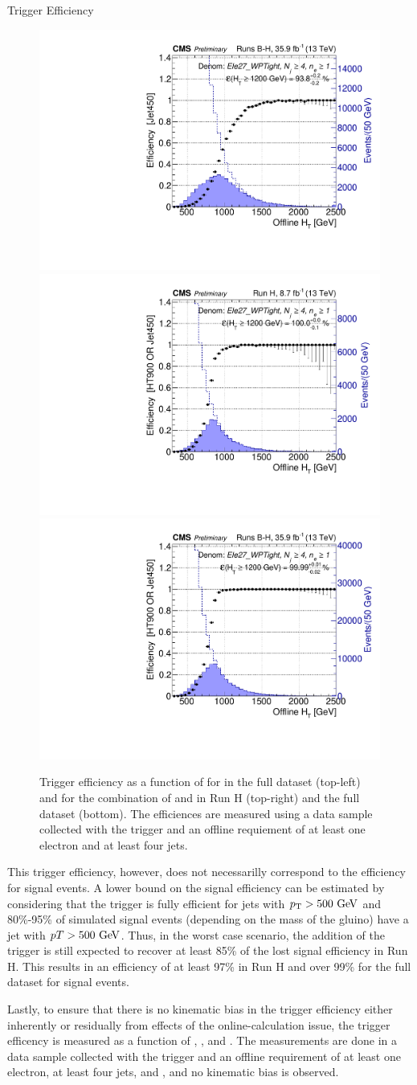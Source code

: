 \begin{section}{Trigger Efficiency}
\begin{figure}[tbp!]
\centering
\includegraphics[angle=0,width=0.45\columnwidth]{fig/trig_jet_runsbh.pdf}
\includegraphics[angle=0,width=0.45\columnwidth]{fig/trig_ht_jet_runh.pdf}
\includegraphics[angle=0,width=0.45\columnwidth]{fig/trig_ht_jet_runsbh.pdf}
\caption{Trigger efficiency as a function of \HT for \trigJet in the full dataset (top-left) and for the combination of \trigHT and \trigJet in Run H (top-right) and the full dataset (bottom).
The efficiences are measured using a data sample collected with the \trigEle trigger and an offline requiement of at least one electron and at least four jets.}
\label{fig:ht_jet_trigger}
\end{figure}

This trigger efficiency, however, does not necessarilly correspond to the efficiency for signal events.
A lower bound on the signal efficiency can be estimated by considering that the \trigJet trigger is fully efficient for jets with $p_{\mathrm{T}} > 500~\mathrm{Ge\kern -0.1em V}$ and 80\%-95\% of simulated signal events (depending on the mass of the gluino) have a jet with $pT > 500~\mathrm{Ge\kern -0.1em V}$.
Thus, in the worst case scenario, the addition of the \trigJet trigger is still expected to recover at least 85\% of the lost signal efficiency in Run H.
This results in an efficiency of at least 97\% in Run H and over 99\% for the full dataset for signal events.

Lastly, to ensure that there is no kinematic bias in the trigger efficiency either inherently or residually from effects of the online-\HT calculation issue, the trigger efficency is measured as a function of \MJ, \Njets, and \Nb.
The measurements are done in a data sample collected with the \trigEle trigger and an offline requirement of at least one electron, at least four jets, and \baseHT, and no kinematic bias is observed.

\end{section}

